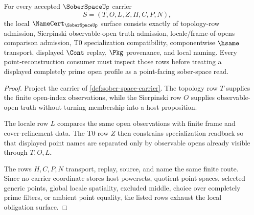 \begin{theorem}
\label{thm:sober-space-namecert-obligations}
For every accepted $\SoberSpaceUp$ carrier
$$
S=(T,O,L,Z,H,C,P,N),
$$
the local $\NameCert_{\SoberSpaceUp}$ surface consists exactly of topology-row admission, Sierpinski observable-open truth admission, locale/frame-of-opens comparison admission, T0 specialization compatibility, componentwise $\hsame$ transport, displayed $\Cont$ replay, $\Pkg$ provenance, and local naming. Every point-reconstruction consumer must inspect those rows before treating a displayed completely prime open profile as a point-facing sober-space read.
\end{theorem}
\begin{proof}
Project the carrier of \autoref{def:sober-space-carrier}. The topology row $T$ supplies the finite open-index observations, while the Sierpinski row $O$ supplies observable-open truth without turning membership into a host proposition.

The locale row $L$ compares the same open observations with finite frame and cover-refinement data. The T0 row $Z$ then constrains specialization readback so that displayed point names are separated only by observable opens already visible through $T,O,L$.

The rows $H,C,P,N$ transport, replay, source, and name the same finite route. Since no carrier coordinate stores host powersets, quotient point spaces, selected generic points, global locale spatiality, excluded middle, choice over completely prime filters, or ambient point equality, the listed rows exhaust the local obligation surface.
\end{proof}

